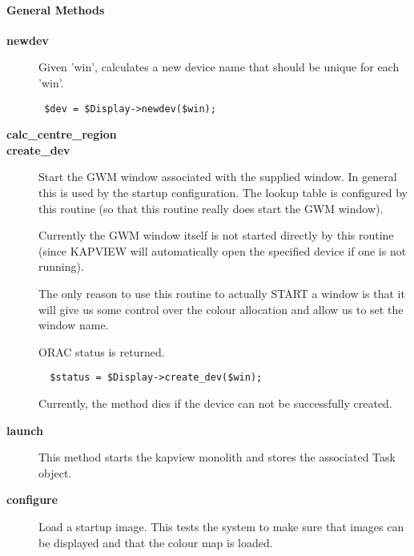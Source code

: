 \paragraph*{General Methods\label{ORAC::Display::KAPVIEW_General_Methods}}
\begin{description}

\item[{\textbf{newdev}}] \mbox{}

Given 'win', calculates a new device name that should be unique for
each 'win'.

\begin{verbatim}
 $dev = $Display->newdev($win);
\end{verbatim}

\item[{\textbf{calc\_centre\_region}}] \mbox{}
\item[{\textbf{create\_dev}}] \mbox{}

Start the GWM window associated with the supplied window.
In general this is used by the startup configuration.
The lookup table is configured by this routine (so that
this routine really does start the GWM window).



Currently the GWM window itself is not started directly
by this routine (since KAPVIEW will automatically open
the specified device if one is not running).



The only reason to use this routine to actually START a window
is that it will give us some control over the colour allocation
and allow us to set the window name.



ORAC status is returned.

\begin{verbatim}
  $status = $Display->create_dev($win);
\end{verbatim}


Currently, the method dies if the device can not be successfully
created.


\item[{\textbf{launch}}] \mbox{}

This method starts the kapview monolith and stores the associated
Task object.


\item[{\textbf{configure}}] \mbox{}

Load a startup image. This tests the system to make sure that images
can be displayed and that the colour map is loaded.




\end{description}
